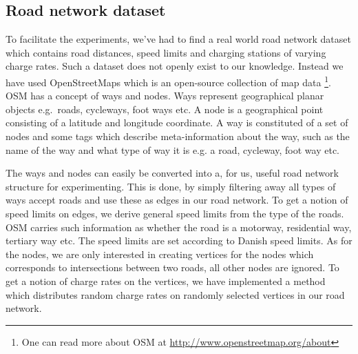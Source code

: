 \subsection{Road network dataset} 
\label{sub:setup}
To facilitate the experiments, we've had to find a real world road network dataset which contains road distances, speed limits and charging stations of varying charge rates. Such a dataset does not openly exist to our knowledge. Instead we have used OpenStreetMaps which is an open-source collection of map data \footnote{One can read more about OSM at \url{http://www.openstreetmap.org/about}}. OSM has a concept of ways and nodes. Ways represent geographical planar objects e.g.\ roads, cycleways, foot ways etc. A node is a geographical point consisting of a latitude and longitude coordinate. A way is constituted of a set of nodes and some tags which describe meta-information about the way, such as the name of the way and what type of way it is e.g. a road, cycleway, foot way  etc. 

The ways and nodes can easily be converted into a, for us, useful road network structure for experimenting. This is done, by simply filtering away all types of ways accept roads and use these as edges in our road network. To get a notion of speed limits on edges, we derive general speed limits from the type of the roads. OSM carries such information as whether the road is a motorway, residential way, tertiary way etc. The speed limits are set according to Danish speed limits. As for the nodes, we are only interested in creating vertices for the nodes which corresponds to intersections between two roads, all other nodes are ignored. To get a notion of charge rates on the vertices, we have implemented a method which distributes random charge rates on randomly selected vertices in our road network.
